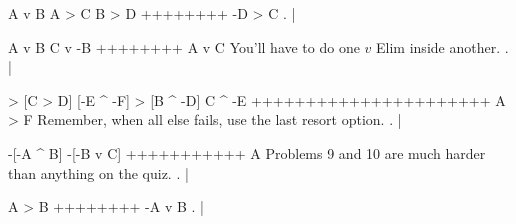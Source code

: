 \argument
 A v B
 A > C
 B > D
++++++++
 -D > C
\endargument
        \answer
        . | 
        \endfitchproof
        \endanswer

\argument
 A v B
 C v -B
++++++++
 A v C
\endargument
\Hint You'll have to do one $v$ Elim inside another.
        \answer
        . | 
        \endfitchproof
        \endanswer

\resetfitchsetup
{}
\argument
 [A ^ B] > [C > D]
 [-E ^ -F] > [B ^ -D]
 C ^ -E
++++++++++++++++++++++
 A > F
\endargument
\Hint Remember, when all else fails, use the last resort option.
        \answer
        . | 
        \endfitchproof
        \endanswer

\argument
 -[-A ^ B]
 -[-B v C]
+++++++++++
 A
\endargument
\Hint Problems 9 and 10 are much harder than anything on the quiz.
        \answer
        . | 
        \endfitchproof
        \endanswer

\argument
 A > B
++++++++
 -A v B
\endargument
        \answer
        . | 
        \endfitchproof
        \endanswer

\endproblems
\bye
